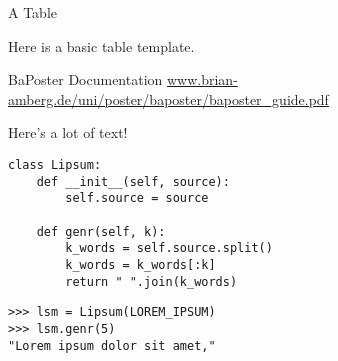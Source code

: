 \documentclass[portrait,a0paper]{baposter} %
\begin{document}
\begin{poster}
\begin{posterbox}[name=box1,below=box0,span=2]{A Table}

Here is a basic table template.

\end{posterbox}
\begin{posterbox}[name=box2,span=1,align=box0,column=1]{BaPoster Documentation}
\url{www.brian-amberg.de/uni/poster/baposter/baposter_guide.pdf}
\end{posterbox}

\begin{posterbox}[name=box3,span=1,aligned=box0,column=2]{Here's a lot of text!}
\lipsum[1-2]
\begin{verbatim}
class Lipsum:
    def __init__(self, source):
        self.source = source
    
    def genr(self, k):
        k_words = self.source.split()
        k_words = k_words[:k]
        return " ".join(k_words)
\end{verbatim}
\lipsum[3]
\begin{verbatim}
>>> lsm = Lipsum(LOREM_IPSUM)
>>> lsm.genr(5)
"Lorem ipsum dolor sit amet,"
\end{verbatim}
\end{posterbox}
\end{poster}
\end{document}

